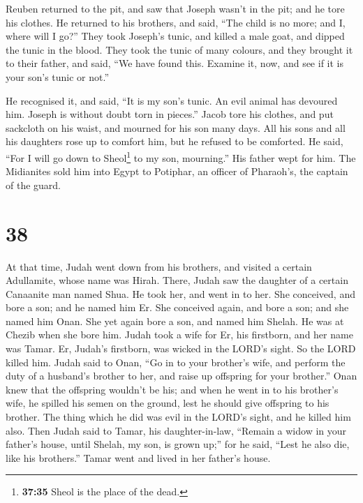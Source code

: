 Reuben returned to the pit, and saw that Joseph wasn't
in the pit; and he tore his clothes.  He returned to his
brothers, and said, ``The child is no more; and I, where will I go?''
 They took Joseph's tunic, and killed a male goat, and
dipped the tunic in the blood.  They took the tunic of
many colours, and they brought it to their father, and said, ``We have
found this. Examine it, now, and see if it is your son's tunic or not.''

 He recognised it, and said, ``It is my son's tunic. An
evil animal has devoured him. Joseph is without doubt torn in pieces.''
 Jacob tore his clothes, and put sackcloth on his waist,
and mourned for his son many days.  All his sons and all
his daughters rose up to comfort him, but he refused to be comforted. He
said, ``For I will go down to Sheol\footnote{\textbf{37:35} Sheol is the
  place of the dead.} to my son, mourning.'' His father wept for him.
 The Midianites sold him into Egypt to Potiphar, an
officer of Pharaoh's, the captain of the guard.

\hypertarget{section-37}{%
\section{38}\label{section-37}}

 At that time, Judah went down from his brothers, and
visited a certain Adullamite, whose name was Hirah. 
There, Judah saw the daughter of a certain Canaanite man named Shua. He
took her, and went in to her.  She conceived, and bore a
son; and he named him Er.  She conceived again, and bore a
son; and she named him Onan.  She yet again bore a son,
and named him Shelah. He was at Chezib when she bore him. 
Judah took a wife for Er, his firstborn, and her name was Tamar.
 Er, Judah's firstborn, was wicked in the LORD's sight. So
the LORD killed him.  Judah said to Onan, ``Go in to your
brother's wife, and perform the duty of a husband's brother to her, and
raise up offspring for your brother.''  Onan knew that the
offspring wouldn't be his; and when he went in to his brother's wife, he
spilled his semen on the ground, lest he should give offspring to his
brother.  The thing which he did was evil in the LORD's
sight, and he killed him also.  Then Judah said to Tamar,
his daughter-in-law, ``Remain a widow in your father's house, until
Shelah, my son, is grown up;'' for he said, ``Lest he also die, like his
brothers.'' Tamar went and lived in her father's house.

